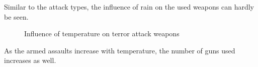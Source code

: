 Similar to the attack types, the influence of rain  on the used weapons can hardly be seen.


\newpage

\begin{figure}[!ht]
\centering
    \qquad
    \qquad
    \qquad
    \qquad
    \qquad
\caption{Influence of temperature on terror attack weapons}
\label{fig:example subfigure}
\end{figure}

As the armed assaults increase with temperature, the number of guns used increases as well.
